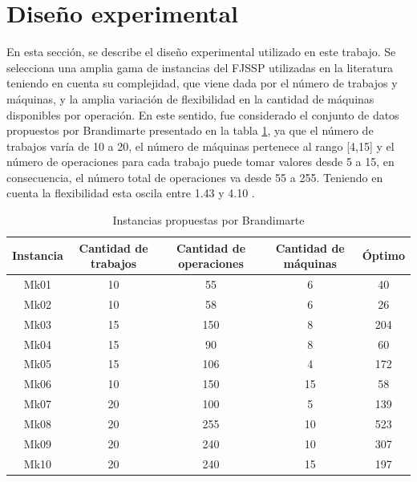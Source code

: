 \section{Diseño experimental}


En esta sección, se describe el diseño experimental utilizado en este trabajo. Se selecciona una amplia gama de instancias del FJSSP utilizadas en la literatura teniendo en cuenta su complejidad, que viene dada por el número de trabajos y máquinas, y la amplia variación de flexibilidad en la cantidad de máquinas disponibles por operación. En este sentido, fue considerado el conjunto de datos propuestos por Brandimarte \cite{Brandimarte} presentado en la tabla \ref{tab:InstanciasBrandirmarte}, ya que el número de trabajos varía de 10 a 20, el número de máquinas pertenece al rango [4,15] y el número de operaciones para cada trabajo puede tomar valores desde 5 a 15, en consecuencia, el número total de operaciones va desde 55 a 255. Teniendo en cuenta la flexibilidad esta oscila entre 1.43 y 4.10 \cite{MinettiSalto}.


\begin{table}[!tb]
    \scriptsize
  \centering
  \caption{Instancias propuestas por Brandimarte}
    \begin{tabular}{|c|c|c|c|c|}
    \hline
    \textbf{Instancia} & \textbf{Cantidad de trabajos} & \textbf{Cantidad de operaciones} & \textbf{Cantidad de máquinas} & \textbf{Óptimo} \bigstrut\\
    \hline
    Mk01 & 10  & 55  & 6   & 40 \\
    Mk02 & 10  & 58  & 6   & 26 \\
    Mk03 & 15  & 150 & 8   & 204 \\
    Mk04 & 15  & 90  & 8   & 60 \\
    Mk05 & 15  & 106 & 4   & 172 \\
    Mk06 & 10  & 150 & 15  & 58 \\
    Mk07 & 20  & 100 & 5   & 139 \\
    Mk08 & 20  & 255 & 10  & 523 \\
    Mk09 & 20  & 240 & 10  & 307 \\
    Mk10 & 20  & 240 & 15  & 197 \\
    \hline
    \end{tabular}%
  \label{tab:InstanciasBrandirmarte}%
\end{table}%

